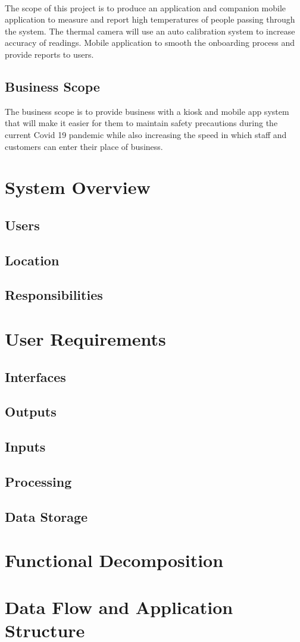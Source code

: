 \documentclass[12pt, letterpaper]{article}
\begin{document}
    \paragraph{}
    The scope of this project is to produce an application and companion mobile application 
    to measure and report high temperatures of people passing through the system. The 
    thermal camera will use an auto calibration system to increase accuracy of 
    readings. Mobile application to smooth the onboarding process and provide reports 
    to users.
    \subsection{Business Scope}
    The business scope is to provide business with a kiosk and mobile app system that will make 
    it easier for them to maintain safety precautions during the current Covid 19 
    pandemic while also increasing the speed in which staff and customers can enter their place of business.
    \section{System Overview}
    \subsection{Users}
    \subsection{Location}
    \subsection{Responsibilities}
    \section{User Requirements}
    \subsection{Interfaces}
    \subsection{Outputs}
    \subsection{Inputs}
    \subsection{Processing}
    \subsection{Data Storage}
    \section{Functional Decomposition}
    \section{Data Flow and Application Structure}
\end{document}
